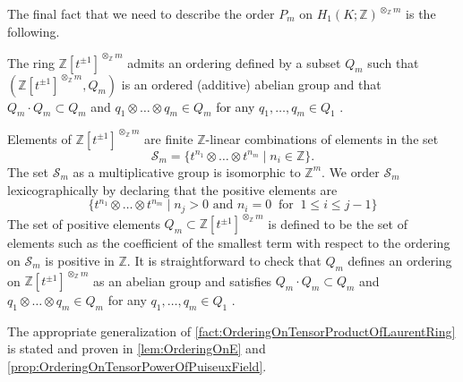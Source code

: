 \documentclass{amsart}
\makeatletter
\renewenvironment{proof}[1][\proofname]{%
   \par\pushQED{\qed}\normalfont%
   \topsep6\p@\@plus6\p@\relax
   \trivlist\item[\hskip\labelsep\bfseries#1\@addpunct{.}]%
   \ignorespaces
}{%
   \popQED\endtrivlist\@endpefalse
}
\makeatother
\begin{document}
The final fact that we need to describe the order $P_m$ on $H_1(K;\mathbb{Z})^{\otimes_\mathbb{Z} m}$ is the following.  
\begin{fact}
\label{fact:OrderingOnTensorProductOfLaurentRing}
    The ring $\mathbb{Z}[t^{\pm 1}]^{\otimes_\mathbb{Z} m}$ admits an ordering defined by a subset $Q_m$ such that $(\mathbb{Z}[t^{\pm 1}]^{\otimes_\mathbb{Z} m},Q_m)$ is an ordered (additive) abelian group and that $Q_m \cdot Q_m \subset Q_m$ and $q_1 \otimes \dots \otimes q_m \in Q_m$ for any $q_1,\dots,q_m \in Q_1$ . 
\end{fact}
\begin{proof}[Sketch of the proof]
Elements of $\mathbb{Z}[t^{\pm 1}]^{\otimes_\mathbb{Z} m}$ are finite $\mathbb{Z}$-linear combinations of elements in the set
\[
\mathcal{S}_m = \{t^{n_1} \otimes \dots \otimes t^{n_m} \mid n_i \in \mathbb{Z}\}.
\]
The set $\mathcal{S}_m$ as a multiplicative group is isomorphic to $\mathbb{Z}^m$. We order $\mathcal{S}_m$ lexicographically by declaring that the positive elements are
\[
\{t^{n_1} \otimes \dots \otimes t^{n_m} \mid n_j > 0 \text{ and } n_i = 0 \ \text{ for } \ 1 \leq i \leq j-1\}
\]
The set of positive elements $Q_m \subset \mathbb{Z}[t^{\pm 1}]^{\otimes_\mathbb{Z} m}$ is defined to be the set of elements such as the coefficient of the smallest term with respect to the ordering on $\mathcal{S}_m$ is positive in $\mathbb{Z}.$ It is straightforward to check that $Q_m$ defines an ordering on $\mathbb{Z}[t^{\pm 1}]^{\otimes_\mathbb{Z} m}$ as an abelian group and satisfies $Q_m \cdot Q_m \subset Q_m$ and $q_1 \otimes \dots \otimes q_m \in Q_m$ for any $q_1,\dots,q_m \in Q_1$ . 
\end{proof}

\noindent
The appropriate generalization of \cref{fact:OrderingOnTensorProductOfLaurentRing} is stated and proven in \cref{lem:OrderingOnE} and \cref{prop:OrderingOnTensorPowerOfPuiseuxField}. 
\end{document}
